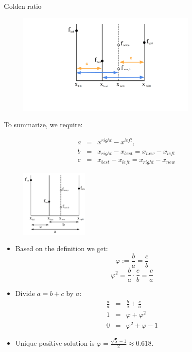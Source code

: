 \documentclass[11pt,compress,t,notes=noshow, xcolor=table]{beamer}
\begin{document}
\begin{vbframe}{Golden ratio}
\begin{figure}
\includegraphics[width=0.8\textwidth]{figure_man/goldensec-4.png}\\
\end{figure}

\framebreak 

To summarize, we require: 

\begin{eqnarray*}
    a &=& x^{right}-x^{left}, \\
    b &=& x_{right} - x_{best} = x_{new} - x_{left} \\
    c &=& x_{best} - x_{left} = x_{right} - x_{new}
\end{eqnarray*}

\vspace*{-0.3cm}

\begin{figure}
\includegraphics[width=0.3\textwidth]{figure_man/goldensec.png}\\
\end{figure}

\begin{itemize}
\item Based on the definition we get: 
$$
\varphi := \frac{b}{a} = \frac{c}{b}
$$
$$
\varphi^2 = \frac{b}{a} \cdot \frac{c}{b} = \frac{c}{a}
$$

\item Divide $a = b + c$ by $a$:
\begin{eqnarray*}
\frac{a}{a} &=& \frac{b}{a} + \frac{c}{a} \\
1 &=& \varphi + \varphi^2 \\
0 &=& \varphi^2 + \varphi - 1
\end{eqnarray*}
\item Unique positive solution is $\varphi = \frac{\sqrt{5}-1}{2} \approx 0.618$.


\end{itemize}
\end{vbframe}
\end{document}
